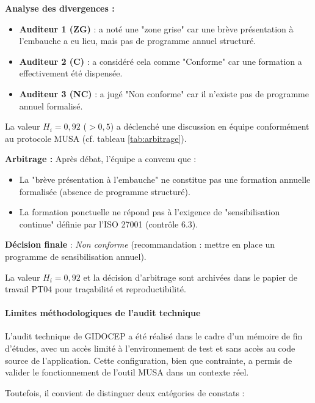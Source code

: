 \documentclass[12pt,a4paper,oneside]{report}
\begin{document}
\textbf{Analyse des divergences :}
\begin{itemize}[label={\color{gold}}, leftmargin=*]
	\item \textbf{Auditeur 1 (ZG)} : a noté une "zone grise" car une 
	brève présentation à l'embauche a eu lieu, mais pas de programme 
	annuel structuré.
	\item \textbf{Auditeur 2 (C)} : a considéré cela comme "Conforme" 
	car une formation a effectivement été dispensée.
	\item \textbf{Auditeur 3 (NC)} : a jugé "Non conforme" car il 
	n'existe pas de programme annuel formalisé.
\end{itemize}

La valeur \(H_i = 0,92\) (\(> 0,5\)) a déclenché une discussion 
en équipe conformément au protocole MUSA (cf. tableau \ref{tab:arbitrage}).

\textbf{Arbitrage :}
Après débat, l'équipe a convenu que :
\begin{itemize}[label={\color{gold}}, leftmargin=*]
	\item La "brève présentation à l'embauche" ne constitue pas 
	une formation annuelle formalisée (absence de programme structuré).
	\item La formation ponctuelle ne répond pas à l'exigence de 
	"sensibilisation continue" définie par l'ISO 27001 (contrôle 6.3).
\end{itemize}

\textbf{Décision finale} : \textit{Non conforme} (recommandation : 
mettre en place un programme de sensibilisation annuel).

La valeur \(H_i = 0,92\) et la décision d'arbitrage sont archivées 
dans le papier de travail PT04 pour traçabilité et reproductibilité.
\paragraph{Limites méthodologiques de l'audit technique}

L'audit technique de GIDOCEP a été réalisé dans le cadre d'un mémoire de 
fin d'études, avec un accès limité à l'environnement de test et sans 
accès au code source de l'application. Cette configuration, bien que 
contrainte, a permis de valider le fonctionnement de l'outil MUSA 
dans un contexte réel.

Toutefois, il convient de distinguer deux catégories de constats :
\end{document}

